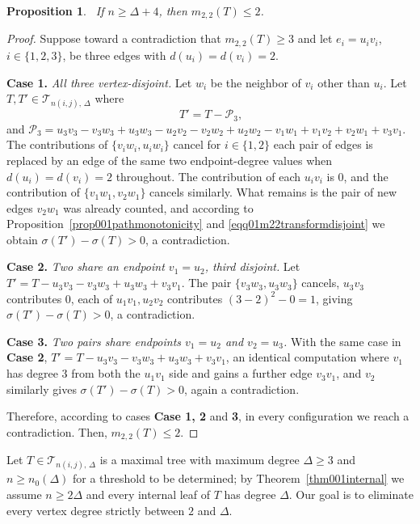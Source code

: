 \documentclass[12pt]{amsart}
\newtheorem{proposition}[theorem]{Proposition}
\newcommand{\TT}{\mathcal{T}}
\begin{document}
\begin{proposition}~\label{propm22boundgeneral001}
If $n\ge\Delta+4$, then $m_{2,2}(T)\leqslant 2$.
\end{proposition}
\begin{proof}
Suppose toward a contradiction that $m_{2,2}(T)\ge3$ and let $e_i=u_iv_i$,
$i\in\{1,2,3\}$, be three edges with $d(u_i)=d(v_i)=2$.

\noindent \textbf{Case 1.} \emph{All three vertex-disjoint.} Let $w_i$ be the neighbor of $v_i$ other than $u_i$. Let $T, T'\in \TT_{n(i,j),\,\Delta}$ where 
\begin{equation}~\label{eqq01m22transformdisjoint}
T'=T - \mathcal P_3,
\end{equation}
 and $\mathcal P_3=u_3v_3-v_3w_3+u_3w_3-u_2v_2-v_2w_2+u_2w_2-v_1w_1+v_1v_2+v_2w_1+v_3v_1.$ The contributions of $\{v_iw_i,u_iw_i\}$ cancel for $i\in\{1,2\}$ each pair
of edges is replaced by an edge of the same two endpoint-degree values when $d(u_i)=d(v_i)=2$ throughout. The contribution of each $u_iv_i$ is $0$, and the contribution of $\{v_1w_1,v_2w_1\}$
cancels similarly. What remains is the pair of new edges $v_2w_1$ was already
counted, and according to Proposition~\ref{prop001pathmonotonicity} and \eqref{eqq01m22transformdisjoint} we obtain $\sigma(T')-\sigma(T)>0$, a contradiction.

\noindent \textbf{Case 2.} \emph{Two share an endpoint $v_1=u_2$, third disjoint.} Let
$T'=T-u_3v_3-v_3w_3+u_3w_3+v_3v_1$. The pair $\{v_3w_3,u_3w_3\}$ cancels, $u_3v_3$ contributes $0$, each of $u_1v_1,u_2v_2$ contributes $(3-2)^2-0=1$, giving $\sigma(T')-\sigma(T)>0$,
a contradiction.

\noindent \textbf{Case 3.}  \emph{Two pairs share endpoints $v_1=u_2$ and $v_2=u_3$.} With the same case in \textbf{Case 2}, 
$T'=T-u_3v_3-v_3w_3+u_3w_3+v_3v_1$, an identical computation where $v_1$ has degree $3$ from both the $u_1v_1$ side and gains a further edge $v_3v_1$, and $v_2$ similarly gives $\sigma(T')-\sigma(T)>0$, again a contradiction.

 Therefore, according to cases \textbf{Case 1, 2} and \textbf{3}, in every configuration we reach a contradiction. Then, $m_{2,2}(T)\leqslant 2$.
\end{proof}


Let  $T\in \TT_{n(i,j),\,\Delta}$ is a maximal tree with maximum degree $\Delta\geqslant 3$ and $n\geqslant n_0(\Delta)$ for a threshold to be determined; by
Theorem~\ref{thm001internal} we assume $n\geqslant 2\Delta$
and every internal leaf of $T$ has degree
$\Delta$. Our goal is to eliminate every vertex degree strictly between $2$ and $\Delta$. 
\end{document}
